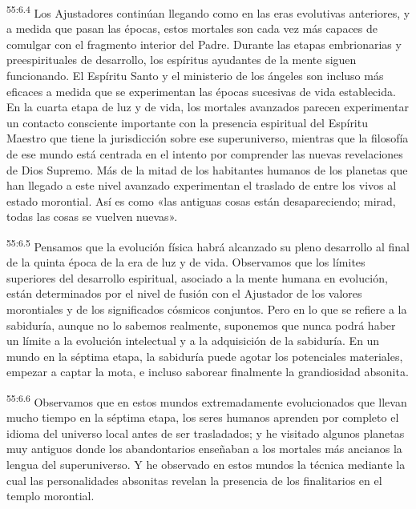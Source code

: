 \par
\textsuperscript{55:6.4} Los Ajustadores continúan llegando como en las eras evolutivas anteriores, y a medida que pasan las épocas, estos mortales son cada vez más capaces de comulgar con el fragmento interior del Padre. Durante las etapas embrionarias y preespirituales de desarrollo, los espíritus ayudantes de la mente siguen funcionando. El Espíritu Santo y el ministerio de los ángeles son incluso más eficaces a medida que se experimentan las épocas sucesivas de vida establecida. En la cuarta etapa de luz y de vida, los mortales avanzados parecen experimentar un contacto consciente importante con la presencia espiritual del Espíritu Maestro que tiene la jurisdicción sobre ese superuniverso, mientras que la filosofía de ese mundo está centrada en el intento por comprender las nuevas revelaciones de Dios Supremo. Más de la mitad de los habitantes humanos de los planetas que han llegado a este nivel avanzado experimentan el traslado de entre los vivos al estado morontial. Así es como «las antiguas cosas están desapareciendo; mirad, todas las cosas se vuelven nuevas».

\par
\textsuperscript{55:6.5} Pensamos que la evolución física habrá alcanzado su pleno desarrollo al final de la quinta época de la era de luz y de vida. Observamos que los límites superiores del desarrollo espiritual, asociado a la mente humana en evolución, están determinados por el nivel de fusión con el Ajustador de los valores morontiales y de los significados cósmicos conjuntos. Pero en lo que se refiere a la sabiduría, aunque no lo sabemos realmente, suponemos que nunca podrá haber un límite a la evolución intelectual y a la adquisición de la sabiduría. En un mundo en la séptima etapa, la sabiduría puede agotar los potenciales materiales, empezar a captar la mota, e incluso saborear finalmente la grandiosidad absonita.

\par
\textsuperscript{55:6.6} Observamos que en estos mundos extremadamente evolucionados que llevan mucho tiempo en la séptima etapa, los seres humanos aprenden por completo el idioma del universo local antes de ser trasladados; y he visitado algunos planetas muy antiguos donde los abandontarios enseñaban a los mortales más ancianos la lengua del superuniverso. Y he observado en estos mundos la técnica mediante la cual las personalidades absonitas revelan la presencia de los finalitarios en el templo morontial.

